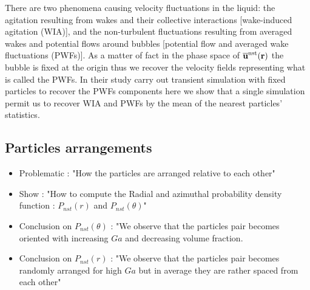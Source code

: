 There are two phenomena causing velocity fluctuations in the liquid:
the agitation resulting from wakes and their collective interactions [wake-induced agitation (WIA)], and the non-turbulent fluctuations resulting from averaged wakes and potential flows around bubbles [potential flow and averaged wake fluctuations (PWFs)].
As a matter of fact in the phase space of $\overline{\textbf{u}}^\text{nst}(\textbf{r})$ the bubble is fixed at the origin thus we recover the velocity fields representing what is called the PWFs. 
In their study \citet{du2022analysis} carry out transient simulation with fixed particles to recover the PWFs components here we show that a single simulation permit us to recover WIA and PWFs by the mean of the nearest particles' statistics. 



\subsection{Particles arrangements}
\begin{itemize}
    \item Problematic : "How the particles are arranged relative to each other"
    \item Show : "How to compute the Radial and azimuthal probability density function : $P_{nst}(r)$  and $P_{nst}(\theta)$"
    \item  Conclusion on $P_{nst}(\theta)$ : "We observe that the particles pair becomes oriented with increasing $Ga$ and decreasing volume fraction.
    \item  Conclusion on $P_{nst}(r)$ : "We observe that the particles pair becomes randomly arranged for high $Ga$ but in average they are rather spaced from each other" 
\end{itemize}

